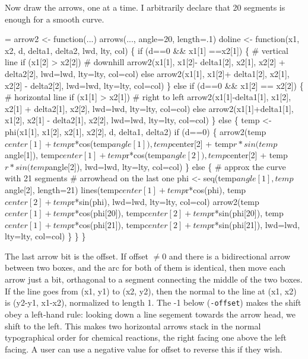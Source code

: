 \documentclass{article}
\newcommand{\code}[1]{\texttt{#1}}
\begin{document}
Now draw the arrows, one at a time.  I arbitrarily declare that 20
segments is enough for a smooth curve.
\begin{nwchunk}
=
 arrow2 <- function(...) arrows(..., angle=20, length=.1)
 doline <- function(x1, x2, d, delta1, delta2, lwd, lty, col) \{
     if (d==0 && x1[1] ==x2[1]) \{ # vertical line
         if (x1[2] > x2[2]) # downhill
             arrow2(x1[1], x1[2]- delta1[2], x2[1], x2[2] + delta2[2],
                    lwd=lwd, lty=lty, col=col)
         else arrow2(x1[1], x1[2]+ delta1[2], x2[1], x2[2] - delta2[2],
                     lwd=lwd, lty=lty, col=col)
     \}
     else if (d==0 && x1[2] == x2[2]) \{  # horizontal line
         if (x1[1] > x2[1])  # right to left
             arrow2(x1[1]-delta1[1], x1[2], x2[1] + delta2[1], x2[2],
                    lwd=lwd, lty=lty, col=col)
         else arrow2(x1[1]+delta1[1], x1[2], x2[1] - delta2[1], x2[2],
                     lwd=lwd, lty=lty, col=col)
     \}
     else \{
         temp <- phi(x1[1], x1[2], x2[1], x2[2], d, delta1, delta2)
         if (d==0) \{        
             arrow2(temp$center[1] + temp$r*cos(temp$angle[1]),
                    temp$center[2] + temp$r*sin(temp$angle[1]),
                    temp$center[1] + temp$r*cos(temp$angle[2]),
                    temp$center[2] + temp$r*sin(temp$angle[2]),
                    lwd=lwd, lty=lty, col=col)
         \}
         else \{
             # approx the curve with 21 segments
             #  arrowhead on the last one
             phi <- seq(temp$angle[1], temp$angle[2], length=21)
             lines(temp$center[1] + temp$r*cos(phi),
                   temp$center[2] + temp$r*sin(phi), lwd=lwd, lty=lty, col=col)
             arrow2(temp$center[1] + temp$r*cos(phi[20]),
                    temp$center[2] + temp$r*sin(phi[20]),
                    temp$center[1] + temp$r*cos(phi[21]),
                    temp$center[2] + temp$r*sin(phi[21]),
                    lwd=lwd, lty=lty, col=col)
         \}
     \}
 \}
\end{nwchunk}
The last arrow bit is the offset.  If offset $\ne 0$ and there is a 
bidirectional
arrow between two boxes, and the arc for both of them is identical,
then move each arrow just a bit, orthagonal to a segment connecting the middle
of the two boxes.
If the line goes from (x1, y1) to (x2, y2), then the normal to the line at
(x1, x2) is (y2-y1, x1-x2), normalized to length 1. 
The -1 below (\code{-offset}) makes the shift obey a left-hand rule: looking
down a line segement towards the arrow head, we shift to the left.
This makes two horizontal arrows stack in the normal typographical order
for chemical reactions, the right facing one above the left facing.
A user can use a negative value for offset to reverse this if they wish.
\end{document}
